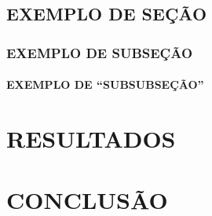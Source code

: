 \documentclass[
    12pt,				%
    a4paper,            %
    oneside,			%
    openright,			%
    ruledheader,
    anapcustomindent,
    sumario = tradicional,
    abntfigtabnum,
    tocpage=plain,
    english,			%
	brazil,				%
    ]{abntex-ifsuldeminas/abntex2-orientadora} %
\begin{document}
    \lipsum[1]
    
    \section{EXEMPLO DE SEÇÃO}
    
        \lipsum[2]
        
        \subsection{EXEMPLO DE SUBSEÇÃO}
        
            \lipsum[3]
            
            \subsubsection{EXEMPLO DE ``SUBSUBSEÇÃO''} %
            
                \lipsum[4]

\chapter{RESULTADOS}

\lipsum[27-30]



\chapter{CONCLUSÃO}

\lipsum[31-33]

\postextual


\printbibliography[title={REFERÊNCIAS}] %
\end{document}
